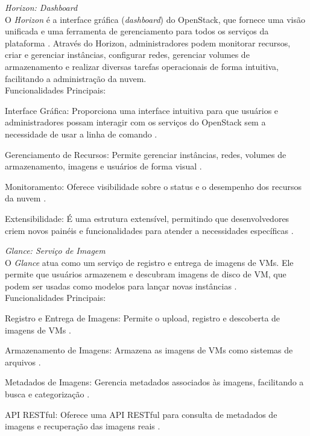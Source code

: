 \begin{description}
    \item \emph{Horizon: Dashboard}\\
    O \textit{Horizon} é a interface gráfica (\textit{dashboard}) do OpenStack, que fornece uma visão unificada e uma ferramenta de gerenciamento para todos os serviços da plataforma \cite{openstackhorizon}. Através do Horizon, administradores podem monitorar recursos, criar e gerenciar instâncias, configurar redes, gerenciar volumes de armazenamento e realizar diversas tarefas operacionais de forma intuitiva, facilitando a administração da nuvem.\\
    Funcionalidades Principais:
    \begin{description}
        \item Interface Gráfica: Proporciona uma interface intuitiva para que usuários e administradores possam interagir com os serviços do OpenStack sem a necessidade de usar a linha de comando \cite{openstackhorizon}.
        \item Gerenciamento de Recursos: Permite gerenciar instâncias, redes, volumes de armazenamento, imagens e usuários de forma visual \cite{openstackhorizon}.
        \item Monitoramento: Oferece visibilidade sobre o status e o desempenho dos recursos da nuvem \cite{openstackhorizon}.
        \item Extensibilidade: É uma estrutura extensível, permitindo que desenvolvedores criem novos painéis e funcionalidades para atender a necessidades específicas \cite{openstackhorizon}.
    \end{description}

    \item \emph{Glance: Serviço de Imagem}\\
    O \textit{Glance} atua como um serviço de registro e entrega de imagens de VMs. Ele permite que usuários armazenem e descubram imagens de disco de VM, que podem ser usadas como modelos para lançar novas instâncias \cite{openstackglance}.\\
    Funcionalidades Principais:
    \begin{description}
        \item Registro e Entrega de Imagens: Permite o upload, registro e descoberta de imagens de VMs \cite{openstackglance}.
        \item Armazenamento de Imagens: Armazena as imagens de VMs como sistemas de arquivos \cite{openstackglance}.
        \item Metadados de Imagens: Gerencia metadados associados às imagens, facilitando a busca e categorização \cite{openstackglance}.
        \item API RESTful: Oferece uma API RESTful para consulta de metadados de imagens e recuperação das imagens reais \cite{openstackglance}.
    \end{description}


\end{description}
